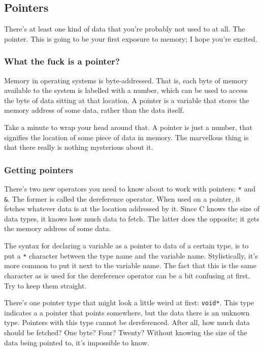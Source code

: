 \documentclass[ebook,11pt,oneside,openany]{memoir}
\begin{document}
\subsection{Pointers}
There's at least one kind of data that you're probably not used to at all. The pointer. This is going to be your first exposure to memory; I hope you're excited.

\subsubsection{What the fuck is a pointer?}
\label{sec:wtf}

Memory in operating systems is byte-addressed. That is, each byte of memory available to the system is labelled with a number, which can be used to access the byte of data sitting at that location. A pointer is a variable that stores the memory address of some data, rather than the data itself. 

Take a minute to wrap your head around that. A pointer is just a number, that signifies the location of some piece of data in memory. The marvellous thing is that there really is nothing mysterious about it.

\subsubsection{Getting pointers}

There's two new operators you need to know about to work with pointers: \texttt{*} and \texttt{\&}. The former is called the dereference operator. When used on a pointer, it fetches whatever data is at the location addressed by it. Since C knows the size of data types, it knows how much data to fetch. The latter does the opposite; it gets the memory address of some data.

The syntax for declaring a variable as a pointer to data of a certain type, is to put a \texttt{*} character between the type name and the variable name. Stylistically, it's more common to put it next to the variable name. The fact that this is the same character as is used for the dereference operator can be a bit confusing at first. Try to keep them straight.

There's one pointer type that might look a little weird at first: \texttt{void*}. This type indicates a a pointer that points somewhere, but the data there is an unknown type. Pointers with this type cannot be dereferenced. After all, how much data should be fetched? One byte? Four? Twenty? Without knowing the size of the data being pointed to, it's impossible to know.
\end{document}
